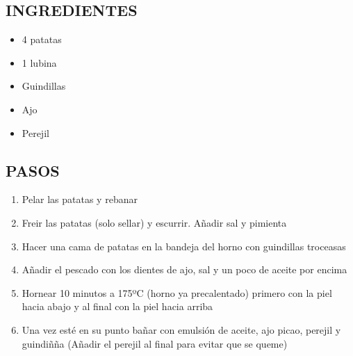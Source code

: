 
\subsection*{INGREDIENTES}
\begin{itemize}
    \item 4 patatas
    \item 1 lubina
    \item Guindillas
    \item Ajo
    \item Perejil
\end{itemize}

\subsection*{PASOS}
\begin{enumerate}
    \item Pelar las patatas y rebanar
    \item Freir las patatas (solo sellar) y escurrir. Añadir sal y pimienta
    \item Hacer una cama de patatas en la bandeja del horno con guindillas troceasas
    \item Añadir el pescado con los dientes de ajo, sal y un poco de aceite por encima
    \item Hornear 10 minutos a 175ºC (horno ya precalentado) primero con la piel hacia abajo y al final con la piel hacia arriba
    \item Una vez esté en su punto bañar con emulsión de aceite, ajo picao, perejil y guindiñña (Añadir el perejil al final para evitar que se queme)
\end{enumerate}

